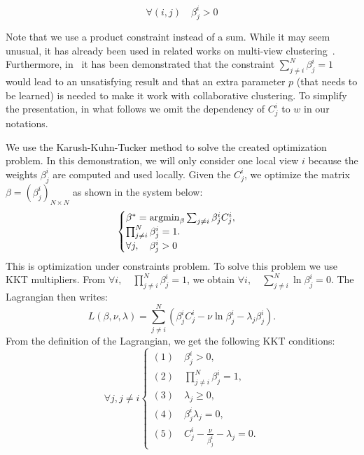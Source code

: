 $$\forall (i,j) \quad \beta_j^i >0 $$ 

Note that we use a product constraint instead of a sum. While it may seem unusual, it has already been used in related works on multi-view clustering~\cite{CarvalhoML15}. Furthermore, in~\cite{Sublime2017} it has been demonstrated that the constraint $\sum_{j \neq i}^N \beta_j^i = 1$ would lead to an unsatisfying result and that an extra parameter $p$ (that needs to be learned) is needed to make it work with collaborative clustering. To simplify the presentation, in what follows we omit the dependency of $C_j^i$ to $w$ in our notations.

We use the Karush-Kuhn-Tucker method to solve the created optimization problem. In this demonstration, we will only consider one local view $i$ because the weights $\beta_j^i$ are computed and used locally.
Given the $C_j^i$, we  optimize the matrix $\beta = {\left(\beta_j^i\right)}_{N \times N}$ as shown in the system below:
\begin{equation}
    \begin{cases}
        \beta^* =  \operatornamewithlimits{argmin}_{\beta}  \sum_{j \neq i} \beta_j^i  C_j^i ,      \\
        \prod_{j \neq i}^N \beta_j^i  = 1. \\
        \forall j, \quad \beta_j^i >   0 \\      
    \end{cases} 
    \label{eq:KKT0-app}
\end{equation} 
This is optimization under constraints problem. To solve this problem  we use KKT multipliers.
From   $\forall i, \quad \prod_{j \neq i}^N \beta_j^i  = 1$, we obtain
$\forall i, \quad \sum_{j \neq i}^N \ln  \beta_j^i   = 0$. The Lagrangian then writes: 
\begin{equation}
    L(\beta,\nu,\lambda)= \sum_{j \neq i}^N ( \beta_j^i  C_j^i - \nu  \ln  \beta_j^i  - \lambda_j   \beta_j^i ).
    \label{eq:Lag-KKT}
\end{equation}
From the definition of the Lagrangian, we get the following KKT conditions:
\begin{equation}
    \forall j, j \neq i
    \begin{cases}
        (1) \quad \beta_j^i > 0,   \\
        (2) \quad \prod_{j \neq i}^N \beta_j^i  = 1,  \\
        (3) \quad \lambda_j \geq 0,  \\
        (4) \quad \beta_j^i  \lambda_j = 0,   \\
        (5) \quad  C_j^i -  \frac{\nu}{ \beta_j^i }   - \lambda_j = 0.
    \end{cases} 
    \label{eq:app-kkt0}
\end{equation} 
